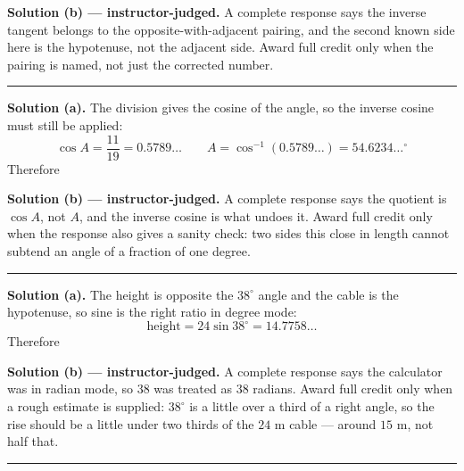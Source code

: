 \documentclass[12pt]{article}
\begin{document}
\noindent\textbf{Solution (b) --- instructor-judged.} A complete response says
the inverse tangent belongs to the opposite-with-adjacent pairing, and the second
known side here is the hypotenuse, not the adjacent side. Award full credit only
when the pairing is named, not just the corrected number.

\vspace{0.15cm}\noindent\rule{\linewidth}{0.2pt}


\noindent\textbf{Solution (a).} The division gives the cosine of the angle, so
the inverse cosine must still be applied:
\[ \cos A = \frac{11}{19} = 0.5789\ldots \qquad
   A = \cos^{-1}(0.5789\ldots) = 54.6234\ldots^\circ \]
Therefore 

\noindent\textbf{Solution (b) --- instructor-judged.} A complete response says
the quotient is $\cos A$, not $A$, and the inverse cosine is what undoes it.
Award full credit only when the response also gives a sanity check: two sides
this close in length cannot subtend an angle of a fraction of one degree.

\vspace{0.15cm}\noindent\rule{\linewidth}{0.2pt}


\noindent\textbf{Solution (a).} The height is opposite the $38^\circ$ angle and
the cable is the hypotenuse, so sine is the right ratio in degree mode:
\[ \text{height} = 24\sin 38^\circ = 14.7758\ldots \]
Therefore 

\noindent\textbf{Solution (b) --- instructor-judged.} A complete response says
the calculator was in radian mode, so $38$ was treated as $38$ radians. Award
full credit only when a rough estimate is supplied: $38^\circ$ is a little over a
third of a right angle, so the rise should be a little under two thirds of the
$24$ m cable --- around $15$ m, not half that.

\vspace{0.15cm}\noindent\rule{\linewidth}{0.2pt}

\end{document}
